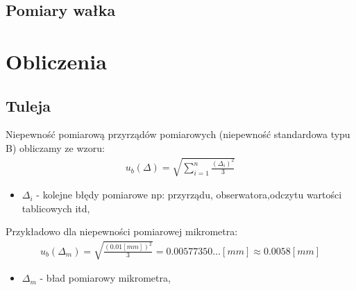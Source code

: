\documentclass[11pt]{article}
\begin{document}
    \subsection{Pomiary wałka}
    \begin{center}
    \end{center}
    \begin{center}
    \end{center}

    \section{Obliczenia}
    \subsection{Tuleja}
    \noindent Niepewność pomiarową przyrządów pomiarowych (niepewność standardowa typu B) obliczamy ze wzoru:
    \begin{gather*}
        u_b(\Delta)=\sqrt{\sum_{i=1}^{n}\frac{(\Delta_i)^2}{3}}
    \end{gather*}
    {\footnotesize
        \begin{itemize}
            \item[] $\Delta_i$ - kolejne błędy pomiarowe np: przyrządu, obserwatora,odczytu wartości tablicowych itd,
        \end{itemize}}
    \noindent Przykładowo dla niepewności pomiarowej mikrometra:
    \begin{gather*}
        u_b(\Delta_m)=\sqrt{\frac{(0.01[mm])^2}{3}}=0.00577350\dots[mm]\approx 0.0058[mm]
    \end{gather*}
    {\footnotesize
        \begin{itemize}
            \item[] $\Delta_m$ - bład pomiarowy mikrometra,
        \end{itemize}}
\end{document}
